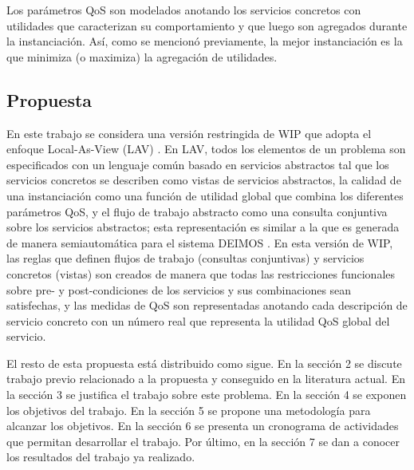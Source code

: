 Los parámetros QoS son modelados anotando los servicios concretos con utilidades
que caracterizan su comportamiento y que luego son agregados durante la
instanciación. Así, como se mencionó previamente, la mejor instanciación es la
que minimiza (o maximiza) la agregación de utilidades.

\subsection{Propuesta}

En este trabajo se considera una versión restringida de WIP que adopta el
enfoque Local-As-View (LAV) \cite{levy:bucket}. En LAV, todos los elementos de un
problema son especificados con un lenguaje común basado en servicios abstractos
tal que los servicios concretos se describen como vistas de servicios
abstractos, la calidad de una instanciación como una función de utilidad global
que combina los diferentes parámetros QoS, y el flujo de trabajo abstracto como
una consulta conjuntiva sobre los servicios abstractos; esta representación es
similar a la que es generada de manera semiautomática para el sistema DEIMOS
\cite{AmbiteISWC09}. En esta versión de WIP, las reglas que definen flujos de trabajo
(consultas conjuntivas) y servicios concretos (vistas) son creados de manera que
todas las restricciones funcionales sobre pre- y post-condiciones de los
servicios y sus combinaciones sean satisfechas, y las medidas de QoS son
representadas anotando cada descripción de servicio concreto con un número real
que representa la utilidad QoS global del servicio.

El resto de esta propuesta está distribuido como sigue. En la sección 2 se
discute trabajo previo relacionado a la propuesta y conseguido en la literatura
actual. En la sección 3 se justifica el trabajo sobre este problema. En la
sección 4 se exponen los objetivos del trabajo. En la sección 5 se propone una
metodología para alcanzar los objetivos. En la sección 6 se presenta un
cronograma de actividades que permitan desarrollar el trabajo. Por último, en la
sección 7 se dan a conocer los resultados del trabajo ya realizado.
